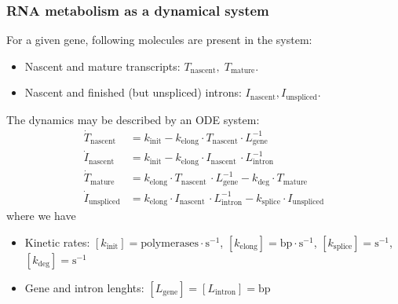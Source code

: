 \documentclass{beamer}
\begin{document}
\begin{frame}
	\frametitle{RNA metabolism as a dynamical system}
	\pause
	 For a given gene, following molecules are present in the system: 
	 \pause 
	 \begin{itemize} 
	 	\item Nascent and mature transcripts: $T_{\mathrm{nascent}}, \; T_{\mathrm{mature}}$. \pause
	 	\item Nascent and finished (but unspliced) introns: ${I}_{\mathrm{nascent}}, {I}_{\mathrm{unspliced}}$. 
	 	\pause 
 	\end{itemize}
	

	
	\vspace{0.5em}
	
	The dynamics may be described by an ODE system:	\pause
	\begin{align*}
		\dot{T}_{\mathrm{nascent}} 
		&= k_{\mathrm{init}}
		- k_{\mathrm{elong}} \cdot T_{\mathrm{nascent}} \cdot L_{\mathrm{gene}}^{-1} \\		
		\dot{{I}}_{\mathrm{nascent}} 
		&= k_{\mathrm{init}}
		- k_{\mathrm{elong}} \cdot {I}_{\mathrm{nascent}} \, \cdot L_{\mathrm{intron}}^{-1} \\		
		\dot{T}_{\mathrm{mature}} 
		&= k_{\mathrm{elong}} \cdot T_{\mathrm{nascent}} \, \cdot L_{\mathrm{gene}}^{-1}
		- k_{\mathrm{deg}} \cdot T_{\mathrm{mature}} \\		
		\dot{{I}}_{\mathrm{unspliced}} 
		&= k_{\mathrm{elong}} \cdot {I}_{\mathrm{nascent}} \, \cdot L_{\mathrm{intron}}^{-1}
		- k_{\mathrm{splice}} \cdot {I}_{\mathrm{unspliced}}
	\end{align*}
where we have
\begin{itemize}
	\item Kinetic rates: $[k_{\mathrm{init}}] = \mathrm{polymerases}\cdot \mathrm{s}^{-1}$, $[k_{\mathrm{elong}}]= \mathrm{bp}\cdot \mathrm{s}^{-1}$, 
	$[k_{\mathrm{splice}}] = \mathrm{s}^{-1}$, $[k_{\mathrm{deg}}] = \mathrm{s}^{-1}$
	\item Gene and intron lenghts: $[L_{\mathrm{gene}}] = [L_{\mathrm{intron}}] = \mathrm{bp}$
\end{itemize}
	
\end{frame}
\end{document}
